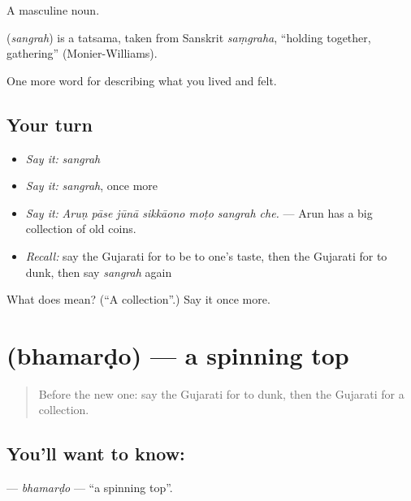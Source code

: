 A masculine noun.

\begin{cousinweb}
\textbf{} (\emph{sangrah}) is a tatsama, taken from Sanskrit \emph{saṃgraha}, \textquotedblleft{}holding together, gathering\textquotedblright{} (Monier-Williams).
\end{cousinweb}

\begin{grammarlens}[title={What you've built}]
One more word for describing what you lived and felt.
\end{grammarlens}

\subsection*{Your turn}
\begin{itemize}
\raggedright
  \item \emph{Say it:} \emph{sangrah}
  \item \emph{Say it:} \emph{sangrah}, once more
  \item \emph{Say it:} \emph{Aruṇ pāse jūnā sikkāono moṭo sangrah che.} — Arun has a big collection of old coins.
  \item \emph{Recall:} say the Gujarati for to be to one's taste, then the Gujarati for to dunk, then say \emph{sangrah} again
\end{itemize}

\begin{tcolorbox}[breakable,colback=teal!4,colframe=teal!35!black,title={Before you move on}]
What does  mean? (\textquotedblleft{}A collection\textquotedblright{}.) Say it once more.
\end{tcolorbox}
\section[\texorpdfstring{\gu{ભમરડો} (bhamarḍo)}{ભમરડો (bhamarḍo)}]{ (bhamarḍo) — a spinning top}

\label{lesson:GU-C524-bhamardo}



\begin{quote}
Before the new one: say the Gujarati for to dunk, then the Gujarati for a collection.
\end{quote}

\subsection*{You'll want to know: }
\textbf{} — \emph{bhamarḍo} — \textquotedblleft{}a spinning top\textquotedblright{}.

